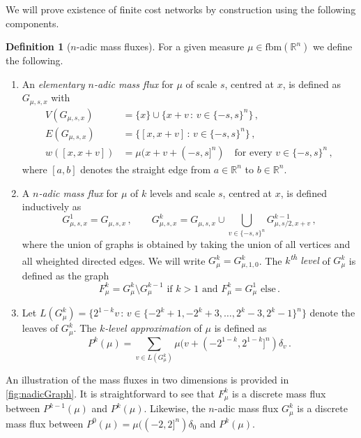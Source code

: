 \documentclass[10pt,a4paper,oneside,final]{article}
\newcommand{\R}{{\mathbb{R}}}
\newcommand{\fbm}{{\mathrm{fbm}}}
\newcommand{\transportPath}{mass flux}
\newcommand{\transportPaths}{mass fluxes}
\numberwithin{equation}{section}
\theoremstyle{plain}
\theoremstyle{definition}
\newtheorem{definition}[theorem]{Definition}
\theoremstyle{remark}
\begin{document}
We will prove existence of finite cost networks by construction using the following components.
\begin{definition}[$n$-adic \transportPaths{}]\label{def:nadicGraph}
For a given measure $\mu\in\fbm(\R^n)$ we define the following.
\begin{enumerate}
\item An \emph{elementary $n$-adic \transportPath{}} for $\mu$ of scale $s$, centred at $x$, is defined as $G_{\mu,s,x}$ with
\begin{align*}
V(G_{\mu,s,x})&=\textstyle\{x\}\cup\{x+v\,:\,v\in\{-s,s\}^n\}\,,\qquad\\
E(G_{\mu,s,x})&=\textstyle\{[x,x+v]\,:\,v\in\{-s,s\}^n\}\,,\qquad\\
w([x,x+v])&=\mu(x+v+(-s,s]^n)\quad\text{for every }v\in\{-s,s\}^n\,,
\end{align*}
where $[a,b]$ denotes the straight edge from $a\in\R^n$ to $b\in\R^n$.
\item A \emph{$n$-adic \transportPath{}} for $\mu$ of $k$ levels and scale $s$, centred at $x$, is defined inductively as
\begin{equation*}
G_{\mu,s,x}^1=G_{\mu,s,x}\,,\qquad
G_{\mu,s,x}^{k}=G_{\mu,s,x}\cup\bigcup_{v\in\{-s,s\}^n}G_{\mu,s/2,x+v}^{k-1}\,,
\end{equation*}
where the union of graphs is obtained by taking the union of all vertices and all wheighted directed edges.
We will write $G_\mu^k=G_{\mu,1,0}^{k}$.
The \emph{$k$\textsuperscript{th} level} of $G_\mu^{k}$ is defined as the graph
\begin{equation*}
F_\mu^{k}=G_\mu^{k}\setminus G_\mu^{k-1}
\text{ if }k>1\text{ and }F_{\mu}^{k}=G_{\mu}^{1}\text{ else}\,.
\end{equation*}
\item Let $L(G_{\mu}^{k})=\{2^{1-k}v\,:\,v\in\{-2^{k}+1,-2^{k}+3,\ldots,2^k-3,2^k-1\}^n\}$ denote the leaves of $G_{\mu}^{k}$.
The \emph{$k$-level approximation} of $\mu$ is defined as
\begin{equation*}
P^k(\mu)=\sum_{v\in L(G_{\mu}^{k})}\mu(v+(-2^{1-k},2^{1-k}]^n)\delta_{v}\,.
\end{equation*}
\end{enumerate}
\end{definition}

An illustration of the \transportPaths{} in two dimensions is provided in \cref{fig:nadicGraph}.
It is straightforward to see that $F_{\mu}^{k}$ is a discrete \transportPath{} between $P^{k-1}(\mu)$ and $P^k(\mu)$.
Likewise, the $n$-adic \transportPath{} $G_{\mu}^k$ is a discrete \transportPath{} between $P^0(\mu)=\mu((-2,2]^n)\delta_0$ and $P^k(\mu)$.
\end{document}
